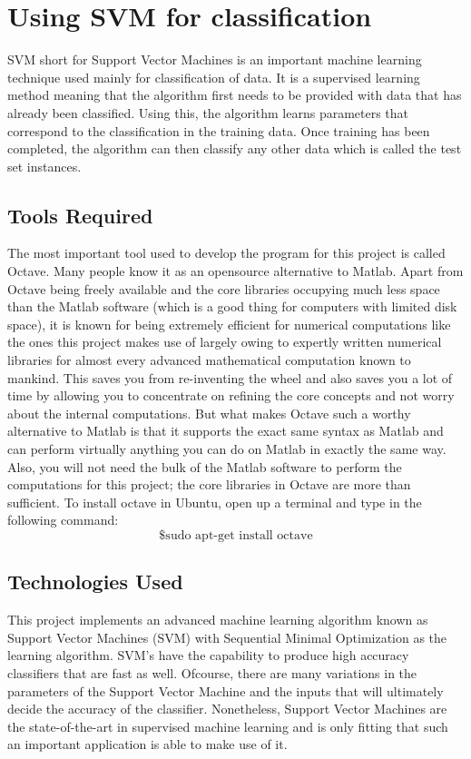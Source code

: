 \documentclass{acm_proc_article-sp}
\begin{document}
\section{Using SVM for classification}

SVM short for Support Vector Machines is an important machine learning technique used mainly for classification of data. It is a supervised learning method meaning that the algorithm first needs to be provided with data that has already been classified. Using this, the algorithm learns parameters that correspond to the classification in the training data. Once training has been completed, the algorithm can then classify any other data which is called the test set instances.

\subsection{Tools Required}

The most important tool used to develop the program for this project is called Octave. Many people know it as an opensource alternative to Matlab. Apart from Octave being freely available and the core libraries occupying much less space than the Matlab software (which is a good thing for computers with limited disk space), it is known for being extremely efficient for numerical computations like the ones this project makes use of largely owing to expertly written numerical libraries for almost every advanced mathematical computation known to mankind. This saves you from re-inventing the wheel and also saves you a lot of time by allowing you to concentrate on refining the core concepts and not worry about the internal computations. But what makes Octave such a worthy alternative to Matlab is that it supports the exact same syntax as Matlab and can perform virtually anything you can do on Matlab in exactly the same way. Also, you will not need the bulk of the Matlab software to perform the computations for this project; the core libraries in Octave are more than sufficient. To install octave in Ubuntu, open up a terminal and type in the following command: 
\begin{displaymath}\text{\$ sudo apt-get install octave}\end{displaymath}

\subsection{Technologies Used}

This project implements an advanced machine learning algorithm known as Support Vector Machines (SVM) with Sequential Minimal Optimization as the learning algorithm. SVM's have the capability to produce high accuracy classifiers that are fast as well. Ofcourse, there are many variations in the parameters of the Support Vector Machine and the inputs that will ultimately decide the accuracy of the classifier. Nonetheless, Support Vector Machines are the state-of-the-art in supervised machine learning and is only fitting that such an important application is able to make use of it.
\end{document}
